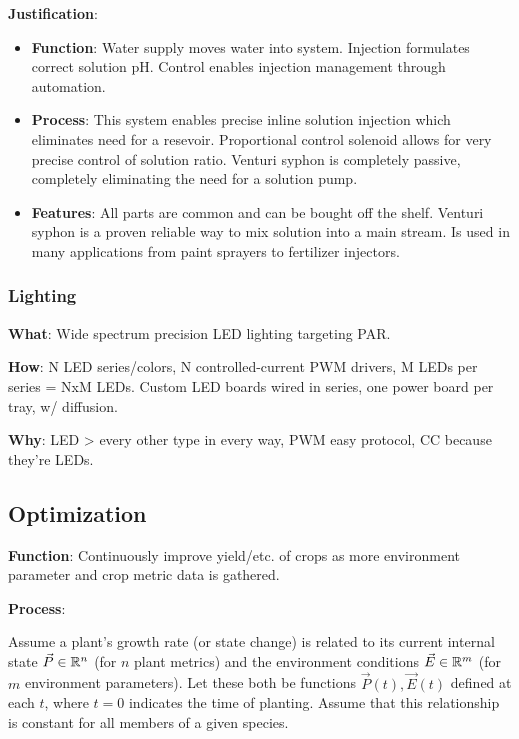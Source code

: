 \documentclass{report}
\begin{document}
\textbf{Justification}: 
\begin{itemize}
    \item \textbf{Function}: Water supply moves water into system. Injection formulates correct solution pH. Control enables injection management through automation.
    \item \textbf{Process}: This system enables precise inline solution injection which eliminates need for a resevoir. Proportional control solenoid allows for very precise control of solution ratio. Venturi syphon is completely passive, completely eliminating the need for a solution pump. 
    \item \textbf{Features}: All parts are common and can be bought off the shelf. Venturi syphon is a proven reliable way to mix solution into a main stream. Is used in many applications from paint sprayers to fertilizer injectors.
\end{itemize}

\newpage


\subsubsection{Lighting}
\label{sec:lighting}

\textbf{What}: Wide spectrum precision LED lighting targeting PAR.

\textbf{How}: N LED series/colors, N controlled-current PWM drivers, M LEDs per series = NxM LEDs. Custom LED boards wired in series, one power board per tray, w/ diffusion.

\textbf{Why}: LED > every other type in every way, PWM easy protocol, CC because they’re LEDs.


\subsection{Optimization}
\label{sec:optimization}

\textbf{Function}: Continuously improve yield/etc. of crops as more environment parameter and crop metric data is gathered.

\textbf{Process}: 

Assume a plant's growth rate (or state change) is related to its current internal state $\vec P \in \mathbb R^n$ (for $n$ plant metrics) and the environment conditions $\vec E \in \mathbb R^m$ (for $m$ environment parameters). Let these both be functions $\vec P (t),\vec E(t)$ defined at each $t$, where $t=0$ indicates the time of planting. Assume that this relationship is constant for all members of a given species.
\end{document}
